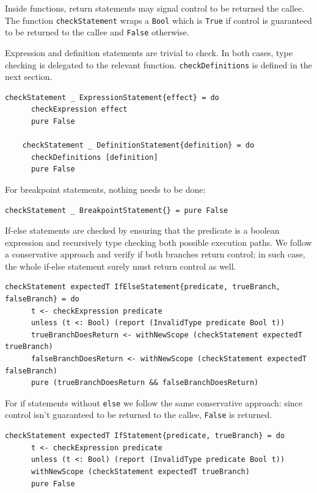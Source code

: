 \documentclass[UdineBachThesis,american,11pt]{PhdThesis}
\begin{document}
  Inside functions, return statements may signal control to be returned the
  callee. The function \mbox{\texttt{checkStatement}} wraps a
  \mbox{\texttt{Bool}} which is \mbox{\texttt{True}} if control is guaranteed to
  be returned to the callee and \mbox{\texttt{False}} otherwise.

  Expression and definition statements are trivial to check. In both cases, type
  checking is delegated to the relevant function.
  \mbox{\texttt{checkDefinitions}} is defined in the next section.

  \begin{Verbatim}[gobble=4,fontsize=\small]
    checkStatement _ ExpressionStatement{effect} = do
      checkExpression effect
      pure False

    checkStatement _ DefinitionStatement{definition} = do
      checkDefinitions [definition]
      pure False
  \end{Verbatim}

  \pagebreak

  For breakpoint statements, nothing needs to be done:

  \begin{Verbatim}[gobble=4,fontsize=\small]
    checkStatement _ BreakpointStatement{} = pure False
  \end{Verbatim}

  If-else statements are checked by ensuring that the predicate is a boolean
  expression and recursively type checking both possible execution paths. We
  follow a conservative approach and verify if both branches return control; in
  such case, the whole if-else statement surely must return control as well.

  \begin{Verbatim}[gobble=4,fontsize=\small]
    checkStatement expectedT IfElseStatement{predicate, trueBranch, falseBranch} = do
      t <- checkExpression predicate
      unless (t <: Bool) (report (InvalidType predicate Bool t))
      trueBranchDoesReturn <- withNewScope (checkStatement expectedT trueBranch)
      falseBranchDoesReturn <- withNewScope (checkStatement expectedT falseBranch)
      pure (trueBranchDoesReturn && falseBranchDoesReturn)
  \end{Verbatim}

  For if statements without \mbox{\texttt{else}} we follow the same conservative
  approach: since control isn't guaranteed to be returned to the callee,
  \mbox{\texttt{False}} is returned.

  \begin{Verbatim}[gobble=4,fontsize=\small]
    checkStatement expectedT IfStatement{predicate, trueBranch} = do
      t <- checkExpression predicate
      unless (t <: Bool) (report (InvalidType predicate Bool t))
      withNewScope (checkStatement expectedT trueBranch)
      pure False
  \end{Verbatim}
\end{document}

